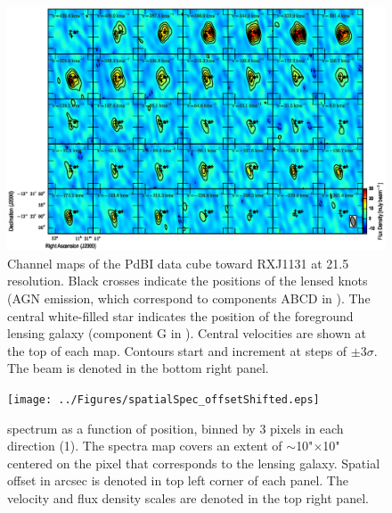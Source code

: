 \documentclass[]{emulateapj}
\begin{document}
\begin{figure}[!htbp]
\centering
\includegraphics[width=1.0\textwidth]{../Figures/co_channel_maps.eps}
\caption{
Channel maps of the PdBI \bco data cube toward RXJ1131 at 21.5\,\kms resolution.
Black crosses indicate the positions of the lensed knots (AGN emission,
which correspond to components ABCD in ). The central white-filled
star indicates the position of the foreground lensing galaxy (component G
in ).
Central velocities are shown at the top of each map.
Contours start and increment at steps of
$\pm$3$\sigma$. The beam is denoted in the bottom right panel. \label{fig:chanmap}}
\end{figure}

\begin{figure}[!htbp]
\centering
\texttt{[image: ../Figures/spatialSpec\_offsetShifted.eps]}
\caption{
\bco spectrum as a function of position, binned by 3 pixels in each
direction (1).
The spectra map covers an extent of $\sim$10"$\times$10"
centered on the pixel that corresponds to the lensing galaxy.
Spatial offset in arcsec is denoted in top left corner of each panel.
The velocity and flux density scales are denoted in the top right panel.
\label{fig:spatialSpec}}
\end{figure}


\end{document}
